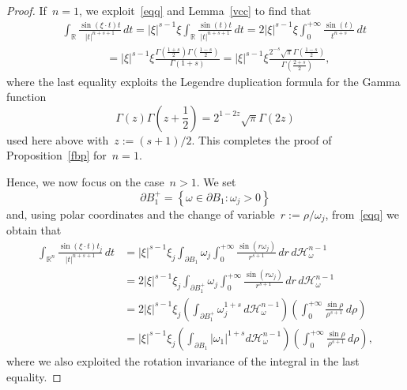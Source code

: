 \documentclass[11pt,hyp,]{nyjm}
\numberwithin{equation}{section}
\newcommand{\R}{\mathbb{R}}
\theoremstyle{remark}
\begin{document}
\begin{proof}
If~$n=1$, we exploit~\eqref{eqq} and Lemma~\ref{vcc} to find that
\begin{eqnarray*}&&
\int_{\R} \frac{\sin(\xi \cdot t) t}{|t|^{n+s+1}} \, dt = |\xi|^{s-1}\xi \int_{\R} \frac{\sin(t) t}{|t|^{n+s+1}} \, dt = 2|\xi|^{s-1}\xi \int_{0}^{+\infty} \frac{\sin(t)}{t^{n+s}} \, dt\\  &&\qquad\qquad= |\xi|^{s-1}\xi \frac{\Gamma(\frac{1+s}{2})\Gamma\left(\frac{1-s}{2}\right)}{\Gamma(1+s)} = |\xi|^{s-1}\xi \frac{2^{-s} \sqrt{\pi}\Gamma\left(\frac{1-s}{2}\right)}{\Gamma\left(\frac{2+s}{2}\right)},
\end{eqnarray*}
where the last equality exploits the Legendre duplication formula for the Gamma function
\begin{equation}\label{lege}
\Gamma(z) \Gamma\left(z+\frac{1}{2}\right)= 2^{1-2z} \sqrt{\pi} \Gamma(2z)
\end{equation}
used here above with~$z:= (s+1)/2$. This completes the proof of Proposition~\ref{fbp} for~$n=1$.

Hence, we now focus on the case~$n>1$. We set
\begin{equation*}
\partial B_1^+ = \left\{ \omega \in \partial B_1: \omega_j>0 \right\}
\end{equation*}
and, using polar coordinates and the change of variable~$r:= \rho/ \omega_j $, from~\eqref{eqq} we obtain that
\begin{equation*}\begin{split}
\int_{\R^n} \frac{\sin(\xi \cdot t) t_j}{|t|^{n+s+1}} \, dt &= |\xi|^{s-1}\xi_j \int_{\partial B_1}\omega_j \int_{0}^{+\infty} \frac{\sin(r \omega_j) }{r^{s+1}} \, dr \, d\mathcal{H}_{\omega}^{n-1}\\ &= 2|\xi|^{s-1}\xi_j \int_{\partial B_1^+}\omega_j \int_{0}^{+\infty} \frac{\sin(r \omega_j) }{r^{s+1}} \, dr \, d\mathcal{H}_{\omega}^{n-1}\\ &=2|\xi|^{s-1}\xi_j \left(\int_{\partial B_1^+}\omega_j^{1+s} \, d\mathcal{H}_{\omega} ^{n-1}\right) \left(\int_{0}^{+\infty} \frac{\sin\rho }{\rho^{s+1}} \, d\rho\right) \\ &= |\xi|^{s-1}\xi_j \left( \int_{\partial B_1}|\omega_1|^{1+s} d\mathcal{H}_{\omega}^{n-1}\right)\left( \int_{0}^{+\infty} \frac{\sin\rho }{\rho^{s+1}} \, d\rho\right),
\end{split}\end{equation*}
where we also exploited the rotation invariance of the integral in the last equality.


\end{proof}
\end{document}
